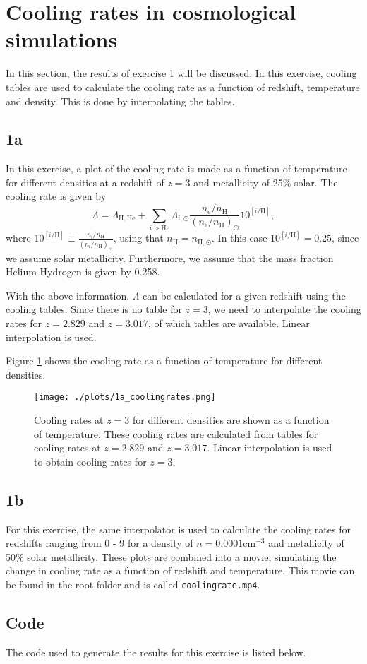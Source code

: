 
\section{Cooling rates in cosmological simulations}
In this section, the results of exercise 1 will be discussed. In this exercise, cooling tables are used to calculate the cooling rate as a function of redshift, temperature and density. This is done by interpolating the tables.

\subsection*{1a}
In this exercise, a plot of the cooling rate is made as a function of temperature for different densities at a redshift of $z=3$ and metallicity of 25\% solar. The cooling rate is given by 
\begin{equation}
    \Lambda = \Lambda_{\mathrm{H},\mathrm{He}} + \sum_{i>\mathrm{He}} \Lambda_{i,\odot} \frac{n_\mathrm{e}/n_\mathrm{H}}{(n_\mathrm{e}/n_\mathrm{H})_\odot} 10^{[i/\mathrm{H}]},
\end{equation}
where $10^{[i/\mathrm{H}]} \equiv \frac{n_\mathrm{i}/n_\mathrm{H}}{(n_\mathrm{i}/n_\mathrm{H})_\odot}$, using that $n_\mathrm{H} = n_{\mathrm{H},\odot}$. In this case $10^{[i/\mathrm{H}]} = 0.25$, since we assume solar metallicity. Furthermore, we assume that the mass fraction Helium Hydrogen is given by 0.258.

With the above information, $\Lambda$ can be calculated for a given redshift using the cooling tables. Since there is no table for $z=3$, we need to interpolate the cooling rates for $z=2.829$ and $z=3.017$, of which tables are available. Linear interpolation is used.

Figure \ref{fig:1a_coolingrates} shows the cooling rate as a function of temperature for different densities.

\begin{figure}[!ht]
  \centering
  \texttt{[image: ./plots/1a\_coolingrates.png]}
  \caption{Cooling rates at $z=3$ for different densities are shown as a function of temperature. These cooling rates are calculated from tables for cooling rates at $z=2.829$ and $z=3.017$. Linear interpolation is used to obtain cooling rates for $z=3$.}
  \label{fig:1a_coolingrates}
\end{figure}

\subsection*{1b}
For this exercise, the same interpolator is used to calculate the cooling rates for redshifts ranging from 0 - 9 for a density of $n = 0.0001 \mathrm{cm}^{−3}$ and metallicity of 50\% solar metallicity. These plots are combined into a movie, simulating the change in cooling rate as a function of redshift and temperature. This movie can be found in the root folder and is called \texttt{coolingrate.mp4}.

\pagebreak

\subsection*{Code}
The code used to generate the results for this exercise is listed below.


\newpage